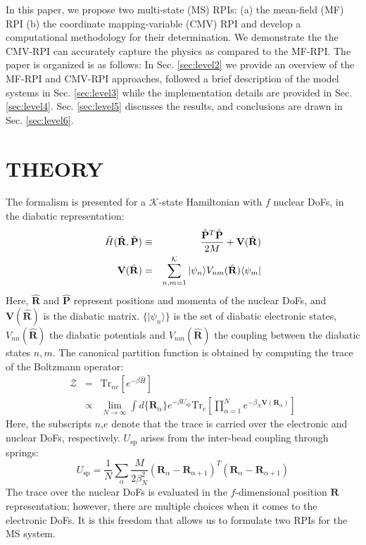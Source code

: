 \documentclass[%
 aip,
 jmp,%
 amsmath,amssymb,
reprint,%
]{revtex4-1}
\begin{document}
In this paper, we propose two multi-state (MS) RPIs: (a) the mean-field (MF) RPI (b) the coordinate mapping-variable (CMV) RPI and develop a computational methodology for their determination. We demonstrate the the CMV-RPI can accurately capture the physics as compared to the MF-RPI. The paper is organized is as follows: In Sec. \ref{sec:level2} we provide an overview of the MF-RPI and CMV-RPI approaches, followed a brief description of the model systems in Sec. \ref{sec:level3} while the implementation details are provided in Sec. \ref{sec:level4}. Sec. \ref{sec:level5} discusses the results, and conclusions are drawn in Sec. \ref{sec:level6}. 

\section{\label{sec:level2}THEORY}
The formalism is presented for a $\mathcal{K}$-state Hamiltonian with $f$ nuclear DoFs, in the diabatic representation:
\begin{eqnarray}
\hat{H}(\hat{\mathbf{R}},\hat{\mathbf{P}}) & \equiv & \dfrac{\hat{\mathbf{P}}^{T}\hat{\mathbf{P}}}{2M} + \mathbf{V}(\hat{\mathbf{R}})  \notag  \\
\mathbf{V}(\hat{\mathbf{R}})  & = & \sum_{n,m=1}^{\mathcal{K}} |\psi_{n} \rangle V_{nm}(\hat{\mathbf{R}}) \langle \psi_{m} |
\end{eqnarray} 
Here, $\hat{\mathbf{R}}$ and $\hat{\mathbf{P}}$ represent positions and momenta of the nuclear DoFs, and $\mathbf{V}(\hat{\mathbf{R}})$ is the diabatic matrix. $\{|\psi_{n}\rangle\}$ is the set of diabatic electronic states, $V_{nn}(\hat{\mathbf{R}})$ the diabatic potentials and $V_{nm}(\hat{\mathbf{R}})$ the coupling between the diabatic states $n,m$. The canonical partition function is obtained by computing the trace of the Boltzmann operator: 
\begin{eqnarray}
\mathcal{Z} & = & \mathrm{Tr}_{ne}[e^{-\beta\hat{H}}] \\
& \propto & \lim_{N\rightarrow \infty} \int d\{ \mathbf{R}_{\alpha} \} e^{-\beta U_{\mathrm{sp}}} \mathrm{Tr}_{e}\left[\prod_{\alpha=1}^{N} e^{-\beta_{N} \mathbf{V}(\mathbf{R}_{\alpha})}\right] \label{ZNElec}
\end{eqnarray}
Here, the subscripts $n$,$e$ denote that the trace is carried over the electronic and nuclear DoFs, respectively. $U_{\mathrm{sp}}$ arises from the inter-bead coupling through springs:
\begin{equation}
U_{\mathrm{sp}} = \dfrac{1}{N}\sum_{\alpha} \dfrac{M}{2\beta_{N}^2}(\mathbf{R}_{\alpha} - \mathbf{R}_{\alpha+1})^T(\mathbf{R}_{\alpha} - \mathbf{R}_{\alpha+1})
\end{equation}
The trace over the nuclear DoFs is evaluated in the $f$-dimensional position $\mathbf{R}$ representation; however, there are multiple choices when it comes to the electronic DoFs. It is this freedom that allows us to formulate two RPIs for the MS system.
\end{document}
